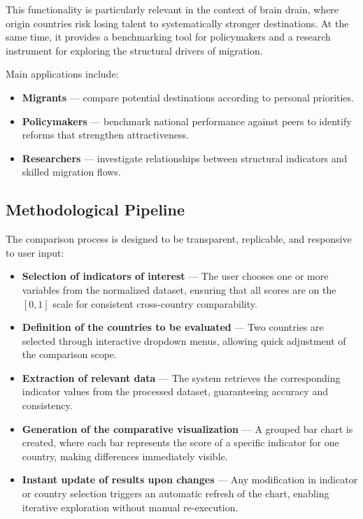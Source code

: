 \documentclass[11pt]{article}
\begin{document}
\noindent
This functionality is particularly relevant in the context of brain drain, where origin countries risk losing talent to systematically stronger destinations. At the same time, it provides a benchmarking tool for policymakers and a research instrument for exploring the structural drivers of migration.  

\noindent
Main applications include:  
\begin{itemize}
    \item \textbf{Migrants} --- compare potential destinations according to personal priorities.  
    \item \textbf{Policymakers} --- benchmark national performance against peers to identify reforms that strengthen attractiveness.  
    \item \textbf{Researchers} --- investigate relationships between structural indicators and skilled migration flows.  
\end{itemize}



\subsection{Methodological Pipeline}

\noindent
The comparison process is designed to be transparent, replicable, and responsive to user input:
\begin{itemize}
    \item \textbf{Selection of indicators of interest} — The user chooses one or more variables from the normalized dataset, ensuring that all scores are on the $[0,1]$ scale for consistent cross-country comparability.
    \item \textbf{Definition of the countries to be evaluated} — Two countries are selected through interactive dropdown menus, allowing quick adjustment of the comparison scope.
    \item \textbf{Extraction of relevant data} — The system retrieves the corresponding indicator values from the processed dataset, guaranteeing accuracy and consistency.
    \item \textbf{Generation of the comparative visualization} — A grouped bar chart is created, where each bar represents the score of a specific indicator for one country, making differences immediately visible.
    \item \textbf{Instant update of results upon changes} — Any modification in indicator or country selection triggers an automatic refresh of the chart, enabling iterative exploration without manual re-execution.
\end{itemize}
\end{document}
